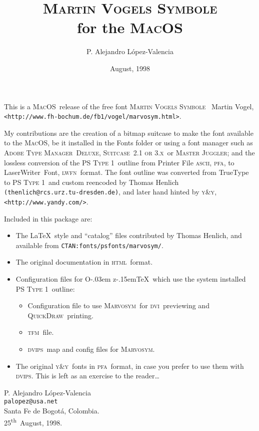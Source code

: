 \documentclass[11pt]{article}
\def\OzTeX{O\kern-.03em z\kern-.15em\TeX}
\def\marvo{\textsc{Marvosym}}
\def\thefont{\textsc{Martin Vogels Symbole}}
\def\atm{\textsc{Adobe Type Manager\texttrademark\ Deluxe}}
\def\suitc{\textsc{Suitcase\texttrademark\ \textnormal{2.1 or 3.x}}}
\def\juggler{\textsc{Master Juggler\texttrademark}}
\def\macos{\textsc{M\textnormal{ac}OS}}
\def\qdraw{\textsc{QuickDraw\texttrademark}}
\def\pfa{\textsc{pfa}}
\def\ascii{\textsc{ascii}}
\def\lwfn{\textsc{lwfn}}
\def\tfm{\textsc{tfm}}
\def\dvips{\textsc{dvips}}
\def\lw{LaserWriter\texttrademark}
\def\yy{\textsc{y\&y}}
\def\html{\textsc{html}}
\def\dvi{\textsc{dvi}}
\def\PS1{\textsc{PS T\textnormal{ype 1}}}
\begin{document}
\title{\thefont \\ for the \macos}
\author{P. Alejandro L\'opez-Valencia}
\date{August, 1998}
\maketitle
\thispagestyle{empty}

This is a \macos\ release of the free font \thefont\  Martin Vogel,  
\verb|<http://www.fh-bochum.de/fb1/vogel/marvosym.html>|.

My contributions are the creation of a bitmap suitcase to make the 
font available to the \macos, be it installed in the Fonts folder or 
using a font manager such as \atm, \suitc\ or \juggler; and the 
lossless conversion of the \PS1\ outline from Printer File \ascii, 
\pfa, to \lw\ Font, \lwfn\, format.
The font outline was converted from TrueType to 
\PS1\ and custom reencoded by Thomas Henlich 
\verb|(thenlich@rcs.urz.tu-dresden.de)|, and later hand hinted by \yy,
\verb|<http://www.yandy.com/>|.

Included in this package are:

\begin{itemize}

\item The  \LaTeX\ style and ``catalog'' files 
contributed by Thomas Henlich, and available from 
\verb|CTAN:fonts/psfonts/marvosym/|.

\item The original documentation in \html\ format.

\item Configuration files for \OzTeX\ which use the system 
installed \PS1\  outline:

\begin{itemize}

\item Configuration file to use \marvo\ for \dvi\ previewing and 
\qdraw\ printing.

\item \tfm\ file.

\item \dvips\ map and config files for \marvo.

\end{itemize}

\item The original \yy\ fonts in \pfa\ format, in 
case you prefer to use them with \dvips. This is left as an 
exercise to the reader\dots

\end{itemize}

\vspace{\baselineskip}

P. Alejandro L\'opez-Valencia \\
\verb|palopez@usa.net| \\
Santa Fe de Bogot\'a, Colombia. \\
25\textsuperscript{th}\ August, 1998.
\end{document}
